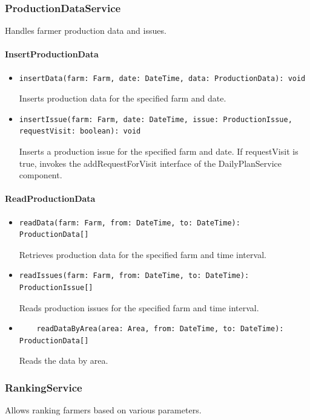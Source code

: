 \documentclass{article}
\begin{document}
\subsubsection{ProductionDataService}
Handles farmer production data and issues.

\paragraph{InsertProductionData}
\begin{itemize}
\item \begin{verbatim}
insertData(farm: Farm, date: DateTime, data: ProductionData): void
\end{verbatim}
Inserts production data for the specified farm and date.
\item \begin{verbatim}
insertIssue(farm: Farm, date: DateTime, issue: ProductionIssue, requestVisit: boolean): void
\end{verbatim}
Inserts a production issue for the specified farm and date. If requestVisit is true, invokes the addRequestForVisit interface of the DailyPlanService component.
\end{itemize}

\paragraph{ReadProductionData}
\begin{itemize}
\item \begin{verbatim}
readData(farm: Farm, from: DateTime, to: DateTime): ProductionData[]
\end{verbatim}
Retrieves production data for the specified farm and time interval.
\item \begin{verbatim}
readIssues(farm: Farm, from: DateTime, to: DateTime): ProductionIssue[]
\end{verbatim}
Reads production issues for the specified farm and time interval.

\item \begin{verbatim}
    readDataByArea(area: Area, from: DateTime, to: DateTime): ProductionData[]
\end{verbatim}
Reads the data by area.
\end{itemize}

\subsubsection{RankingService}
Allows ranking farmers based on various parameters.
\end{document}
